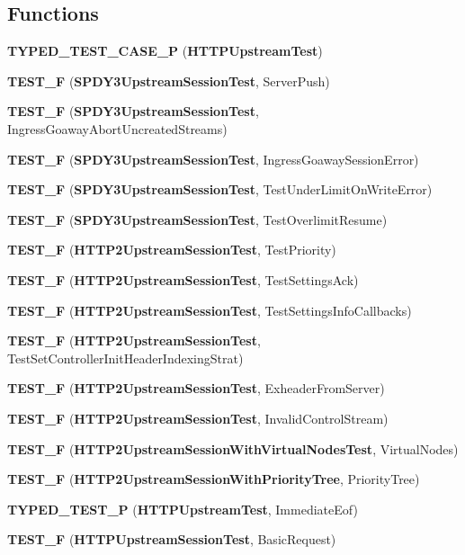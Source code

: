 \subsection*{Functions}
\begin{DoxyCompactItemize}
\item 
{\bf T\+Y\+P\+E\+D\+\_\+\+T\+E\+S\+T\+\_\+\+C\+A\+S\+E\+\_\+P} ({\bf H\+T\+T\+P\+Upstream\+Test})
\item 
{\bf T\+E\+S\+T\+\_\+F} ({\bf S\+P\+D\+Y3\+Upstream\+Session\+Test}, Server\+Push)
\item 
{\bf T\+E\+S\+T\+\_\+F} ({\bf S\+P\+D\+Y3\+Upstream\+Session\+Test}, Ingress\+Goaway\+Abort\+Uncreated\+Streams)
\item 
{\bf T\+E\+S\+T\+\_\+F} ({\bf S\+P\+D\+Y3\+Upstream\+Session\+Test}, Ingress\+Goaway\+Session\+Error)
\item 
{\bf T\+E\+S\+T\+\_\+F} ({\bf S\+P\+D\+Y3\+Upstream\+Session\+Test}, Test\+Under\+Limit\+On\+Write\+Error)
\item 
{\bf T\+E\+S\+T\+\_\+F} ({\bf S\+P\+D\+Y3\+Upstream\+Session\+Test}, Test\+Overlimit\+Resume)
\item 
{\bf T\+E\+S\+T\+\_\+F} ({\bf H\+T\+T\+P2\+Upstream\+Session\+Test}, Test\+Priority)
\item 
{\bf T\+E\+S\+T\+\_\+F} ({\bf H\+T\+T\+P2\+Upstream\+Session\+Test}, Test\+Settings\+Ack)
\item 
{\bf T\+E\+S\+T\+\_\+F} ({\bf H\+T\+T\+P2\+Upstream\+Session\+Test}, Test\+Settings\+Info\+Callbacks)
\item 
{\bf T\+E\+S\+T\+\_\+F} ({\bf H\+T\+T\+P2\+Upstream\+Session\+Test}, Test\+Set\+Controller\+Init\+Header\+Indexing\+Strat)
\item 
{\bf T\+E\+S\+T\+\_\+F} ({\bf H\+T\+T\+P2\+Upstream\+Session\+Test}, Exheader\+From\+Server)
\item 
{\bf T\+E\+S\+T\+\_\+F} ({\bf H\+T\+T\+P2\+Upstream\+Session\+Test}, Invalid\+Control\+Stream)
\item 
{\bf T\+E\+S\+T\+\_\+F} ({\bf H\+T\+T\+P2\+Upstream\+Session\+With\+Virtual\+Nodes\+Test}, Virtual\+Nodes)
\item 
{\bf T\+E\+S\+T\+\_\+F} ({\bf H\+T\+T\+P2\+Upstream\+Session\+With\+Priority\+Tree}, Priority\+Tree)
\item 
{\bf T\+Y\+P\+E\+D\+\_\+\+T\+E\+S\+T\+\_\+P} ({\bf H\+T\+T\+P\+Upstream\+Test}, Immediate\+Eof)
\item 
{\bf T\+E\+S\+T\+\_\+F} ({\bf H\+T\+T\+P\+Upstream\+Session\+Test}, Basic\+Request)
\item 

\end{DoxyCompactItemize}
